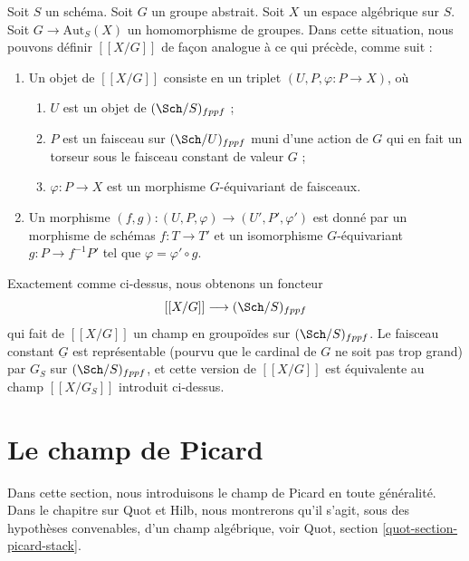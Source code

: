 \begin{remark}
\label{remark-X-mod-G-group}
Soit $S$ un schéma.
Soit $G$ un groupe abstrait.
Soit $X$ un espace algébrique sur $S$.
Soit $G \to \text{Aut}_S(X)$ un homomorphisme de groupes.
Dans cette situation, nous pouvons définir $[[X/G]]$ de façon analogue
à ce qui précède, comme suit :
\begin{enumerate}
\item Un objet de $[[X/G]]$ consiste en un triplet
$(U, P, \varphi : P \to X)$, où
\begin{enumerate}
\item $U$ est un objet de $(\Sch/S)_{fppf}$ ;
\item $P$ est un faisceau sur $(\Sch/U)_{fppf}$ muni
d'une action de $G$ qui en fait un torseur sous le faisceau constant
de valeur $G$ ;
\item $\varphi : P \to X$ est un morphisme $G$-équivariant de faisceaux.
\end{enumerate}
\item Un morphisme
$(f, g) : (U, P, \varphi) \to (U', P', \varphi')$
est donné par un morphisme de schémas $f : T \to T'$
et un isomorphisme $G$-équivariant
$g : P \to f^{-1}P'$ tel que $\varphi = \varphi' \circ g$.
\end{enumerate}
Exactement comme ci-dessus, nous obtenons un foncteur
$$
[[X/G]] \longrightarrow (\Sch/S)_{fppf}
$$
qui fait de $[[X/G]]$ un champ en groupoïdes sur $(\Sch/S)_{fppf}$.
Le faisceau constant $\underline{G}$ est représentable (pourvu que le cardinal de $G$ ne soit
pas trop grand) par $G_S$ sur $(\Sch/S)_{fppf}$,
et cette version de $[[X/G]]$ est équivalente au champ
$[[X/G_S]]$ introduit ci-dessus.
\end{remark}






\section{Le champ de Picard}
\label{section-picard-stack}

\noindent
Dans cette section, nous introduisons le champ de Picard en toute généralité.
Dans le chapitre sur Quot et Hilb, nous montrerons qu'il s'agit, sous des hypothèses
convenables, d'un champ algébrique, voir
Quot, section \ref{quot-section-picard-stack}.

